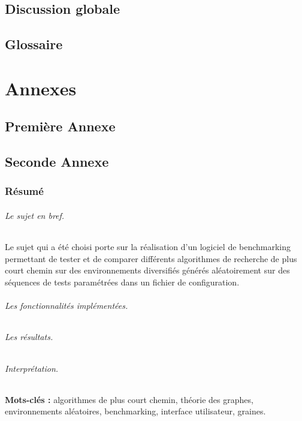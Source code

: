 \documentclass[pidr]{tnreport}
\begin{document}
\chapter{Discussion globale}

\clearpage
\renewcommand{\tocbibname}{Bibliographie / Webographie}


\clearpage

\listoffigures
\clearpage

\listoftables
\clearpage

\lstlistoflistings
\clearpage

\chapter*{Glossaire}

\clearpage
\renewcommand{\thesubsection}{\Roman{subsection}}

\appendix
\part*{Annexes}
\clearpage

\chapter{Première Annexe}
\clearpage

\chapter{Seconde Annexe}


\clearpage
\thispagestyle{empty}

\section*{Résumé}

\paragraph{Le sujet en bref.}
Le sujet qui a été choisi porte sur la réalisation d'un logiciel de benchmarking permettant de tester et de comparer différents algorithmes de recherche de plus court chemin sur des environnements diversifiés générés aléatoirement sur des séquences de tests paramétrées dans un fichier de configuration. \linebreak

\paragraph{Les fonctionnalités implémentées.}

\paragraph{Les résultats.}

\paragraph{Interprétation.}

{\bf Mots-clés :} algorithmes de plus court chemin, théorie des graphes, environnements aléatoires, benchmarking, interface utilisateur, graines.
\end{document}
